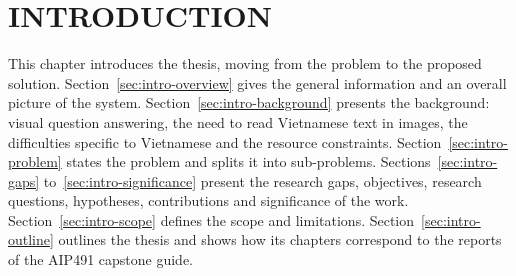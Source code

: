 
\chapter{INTRODUCTION}
\label{chap:intro}

\ifpdf
    \graphicspath{{Chapter1/Figs/Raster/}{Chapter1/Figs/PDF/}{Chapter1/Figs/}}
\else
    \graphicspath{{Chapter1/Figs/Vector/}{Chapter1/Figs/}}
\fi


This chapter introduces the thesis, moving from the problem to the proposed solution.
Section~\ref{sec:intro-overview} gives the general information and an overall
picture of the system. Section~\ref{sec:intro-background} presents the background:
visual question answering, the need to read Vietnamese text in images, the
difficulties specific to Vietnamese and the resource constraints.
Section~\ref{sec:intro-problem} states the problem and splits it into
sub-problems. Sections~\ref{sec:intro-gaps} to~\ref{sec:intro-significance} present
the research gaps, objectives, research questions, hypotheses, contributions and
significance of the work. Section~\ref{sec:intro-scope} defines the scope and
limitations. Section~\ref{sec:intro-outline} outlines the thesis and shows how its chapters correspond to the reports of the AIP491 capstone guide.

